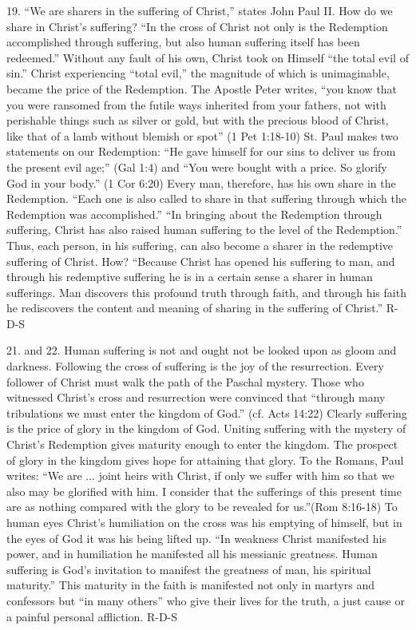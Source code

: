 \documentclass[oneside]{book}
\begin{document}
19. ``We are sharers in the suffering of Christ,'' states John Paul II. How do
we share in Christ's suffering? ``In the cross of Christ not only is the
Redemption accomplished through suffering, but also human suffering itself has
been redeemed.'' Without any fault of his own, Christ took on Himself ``the
total evil of sin.'' Christ experiencing ``total evil,'' the magnitude of which
is unimaginable, became the price of the Redemption. The Apostle Peter writes,
``you know that you were ransomed from the futile ways inherited from your
fathers, not with perishable things such as silver or gold, but with the
precious blood of Christ, like that of a lamb without blemish or spot'' (1 Pet
1:18-10) St. Paul makes two statements on our Redemption: ``He gave himself for
our sins to deliver us from the present evil age;'' (Gal 1:4) and ``You were
bought with a price. So glorify God in your body.'' (1 Cor 6:20) Every man,
therefore, has his own share in the Redemption. ``Each one is also called to
share in that suffering through which the Redemption was accomplished.'' ``In
bringing about the Redemption through suffering, Christ has also raised human
suffering to the level of the Redemption.'' Thus, each person, in his suffering,
can also become a sharer in the redemptive suffering of Christ. How? ``Because
Christ has opened his suffering to man, and through his redemptive suffering he
is in a certain sense a sharer in human sufferings. Man discovers this profound
truth through faith, and through his faith he rediscovers the content and
meaning of sharing in the suffering of Christ.''
R-D-S

21. and 22. Human suffering is not and ought not be looked upon as gloom and
darkness. Following the cross of suffering is the joy of the resurrection. Every
follower of Christ must walk the path of the Paschal mystery. Those who
witnessed Christ's cross and resurrection were convinced that ``through many
tribulations we must enter the kingdom of God.'' (cf. Acts 14:22) Clearly
suffering is the price of glory in the kingdom of God. Uniting suffering with
the mystery of Christ's Redemption gives maturity enough to enter the
kingdom. The prospect of glory in the kingdom gives hope for attaining that
glory. To the Romans, Paul writes: ``We are ... joint heirs with Christ, if only
we suffer with him so that we also may be glorified with him. I consider that
the sufferings of this present time are as nothing compared with the glory to be
revealed for us.''(Rom 8:16-18) To human eyes Christ's humiliation on the cross
was his emptying of himself, but in the eyes of God it was his being lifted
up. ``In weakness Christ manifested his power, and in humiliation he manifested
all his messianic greatness. Human suffering is God's invitation to manifest the
greatness of man, his spiritual maturity.'' This maturity in the faith is
manifested not only in martyrs and confessors but ``in many others'' who give
their lives for the truth, a just cause or a painful personal affliction.
R-D-S
\end{document}
